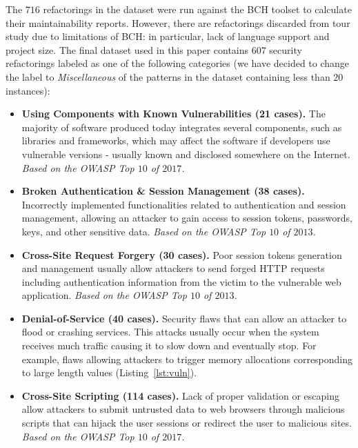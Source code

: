 \documentclass[10pt,conference]{IEEEtran}
\begin{document}
The $716$ refactorings in the dataset were run against the BCH toolset to
calculate their maintainability reports. However, there are refactorings
discarded from tour study due to limitations of BCH: in particular, lack of
language support and project size. The final dataset used in this paper contains
$607$ security refactorings labeled as one of the following categories (we
have decided to change the label to \textit{Miscellaneous} of the patterns in
the dataset containing less than $20$ instances):

\begin{itemize}
    \item \textbf{Using Components with Known Vulnerabilities (21 cases).} The majority of
    software produced today integrates several components, such as libraries and
    frameworks, which may affect the software if developers use vulnerable
    versions - usually known and disclosed somewhere on the Internet.
    \textit{Based on the OWASP Top $10$ of $2017$.}

    \item \textbf{Broken Authentication \& Session Management (38 cases).} Incorrectly
    implemented functionalities related to authentication and session
    management, allowing an attacker to gain access to session tokens,
    passwords, keys, and other sensitive data. \textit{Based on the OWASP Top
    $10$ of $2013$.}

    \item \textbf{Cross-Site Request Forgery (30 cases).} Poor session tokens generation
    and management usually allow attackers to send forged HTTP requests
    including authentication information from the victim to the vulnerable web
    application. \textit{Based on the OWASP Top $10$ of $2013$.}

    \item \textbf{Denial-of-Service (40 cases).} Security flaws that can allow an attacker
    to flood or crashing services. This attacks usually occur when the system
    receives much traffic causing it to slow down and eventually stop. For
    example, flaws allowing attackers to trigger memory allocations
    corresponding to large length values (Listing~\ref{lst:vuln}).

    \item \textbf{Cross-Site Scripting (114 cases).} Lack of proper validation or escaping
    allow attackers to submit untrusted data to web browsers through malicious
    scripts that can hijack the user sessions or redirect the user to malicious
    sites. \textit{Based on the OWASP Top $10$ of $2017$.}


\end{itemize}
\end{document}
